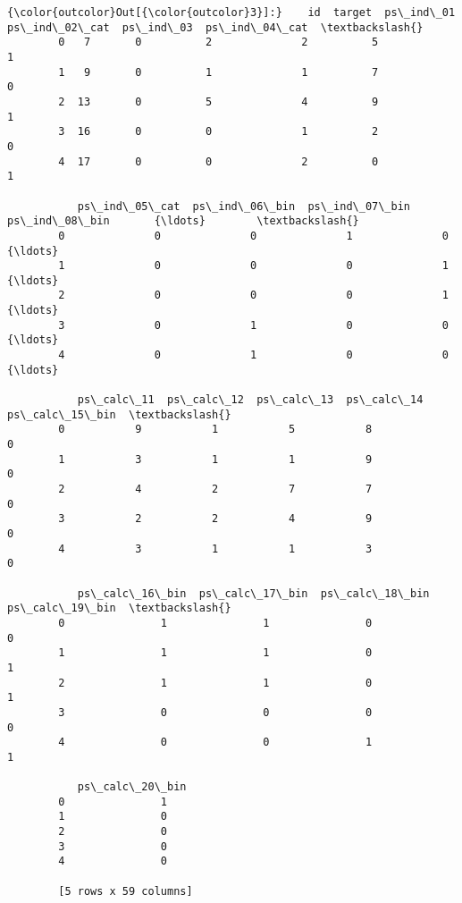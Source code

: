 \documentclass[11pt]{article}
\begin{document}
\begin{Verbatim}[commandchars=\\\{\}]
{\color{outcolor}Out[{\color{outcolor}3}]:}    id  target  ps\_ind\_01  ps\_ind\_02\_cat  ps\_ind\_03  ps\_ind\_04\_cat  \textbackslash{}
        0   7       0          2              2          5              1   
        1   9       0          1              1          7              0   
        2  13       0          5              4          9              1   
        3  16       0          0              1          2              0   
        4  17       0          0              2          0              1   
        
           ps\_ind\_05\_cat  ps\_ind\_06\_bin  ps\_ind\_07\_bin  ps\_ind\_08\_bin       {\ldots}        \textbackslash{}
        0              0              0              1              0       {\ldots}         
        1              0              0              0              1       {\ldots}         
        2              0              0              0              1       {\ldots}         
        3              0              1              0              0       {\ldots}         
        4              0              1              0              0       {\ldots}         
        
           ps\_calc\_11  ps\_calc\_12  ps\_calc\_13  ps\_calc\_14  ps\_calc\_15\_bin  \textbackslash{}
        0           9           1           5           8               0   
        1           3           1           1           9               0   
        2           4           2           7           7               0   
        3           2           2           4           9               0   
        4           3           1           1           3               0   
        
           ps\_calc\_16\_bin  ps\_calc\_17\_bin  ps\_calc\_18\_bin  ps\_calc\_19\_bin  \textbackslash{}
        0               1               1               0               0   
        1               1               1               0               1   
        2               1               1               0               1   
        3               0               0               0               0   
        4               0               0               1               1   
        
           ps\_calc\_20\_bin  
        0               1  
        1               0  
        2               0  
        3               0  
        4               0  
        
        [5 rows x 59 columns]
\end{Verbatim}
            
\end{document}
